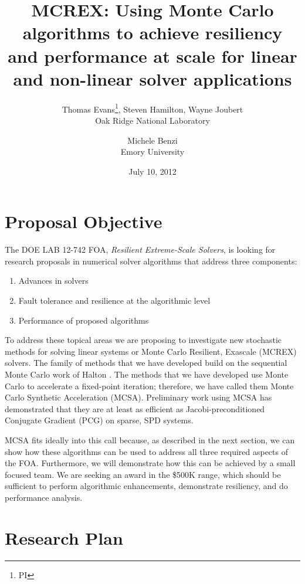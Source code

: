 \documentclass[10pt,letterpaper,english]{article}
\title{MCREX: Using Monte Carlo algorithms to achieve resiliency and
  performance at scale for linear and non-linear solver applications}
\author{Thomas Evans\thanks{PI}, Steven Hamilton, Wayne Joubert\\
  Oak Ridge National Laboratory
  \and Michele Benzi\\Emory University}
\date{July 10, 2012}
\begin{document}
\pagestyle{fancy}

\maketitle


\section*{Proposal Objective}

The DOE LAB 12-742 FOA, {\em Resilient Extreme-Scale Solvers}, is looking for
research proposals in numerical solver algorithms that address three
components:
\begin{enumerate}
\item Advances in solvers
\item Fault tolerance and resilience at the algorithmic level
\item Performance of proposed algorithms
\end{enumerate} 
To address these topical areas we are proposing to investigate new stochastic
methods for solving linear systems or Monte Carlo Resilient, Exascale (MCREX)
solvers.  The family of methods that we have developed build on the sequential
Monte Carlo work of Halton \cite {halton_1962, halton_1994}. The methods that
we have developed use Monte Carlo to accelerate a fixed-point iteration;
therefore, we have called them Monte Carlo Synthetic Acceleration
(MCSA). Preliminary work \cite{rmc,mc} using MCSA has demonstrated that they
are at least as efficient as Jacobi-preconditioned Conjugate Gradient (PCG) on
sparse, SPD systems.

MCSA fits ideally into this call because, as described in the next section, we
can show how these algorithms can be used to address all three required
aspects of the FOA.  Furthermore, we will demonstrate how this can be achieved
by a small focused team.  We are seeking an award in the \$500K range, which
should be sufficient to perform algorithmic enhancements, demonstrate
resiliency, and do performance analysis.


\section*{Research Plan}
\end{document}
